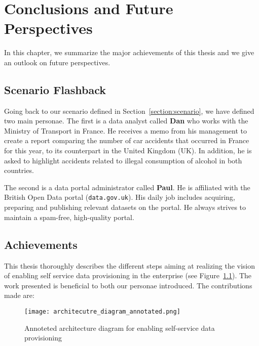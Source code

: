 \chapter{Conclusions and Future Perspectives}  \label{ch:conclusion}
\graphicspath{{conclusions/figures/}}

In this chapter, we summarize the major achievements of this thesis and we give an outlook on future perspectives.

\section{Scenario Flashback}

Going back to our scenario defined in Section~\ref{section:scenario}, we have defined two main personae. The first is a data analyst called \textbf{Dan} who works with the Ministry of Transport in France. He receives a memo from his management to create a report comparing the number of car accidents that occurred in France for this year, to its counterpart in the United Kingdom (UK). In addition, he is asked to highlight accidents related to illegal consumption of alcohol in both countries.

The second is a data portal administrator called \textbf{Paul}. He is affiliated with the British Open Data portal (\texttt{data.gov.uk}). His daily job includes acquiring, preparing and publishing relevant datasets on the portal. He always strives to maintain a spam-free, high-quality portal.

\section{Achievements}

This thesis thoroughly describes the different steps aiming at realizing the vision of enabling self service data provisioning in the enterprise (see Figure~\ref{fig:architecutre_diagram_annotated}). The work presented is beneficial to both our personae introduced. The contributions made are:

\begin{adjustwidth}{-.4in}{-.4in}
	\begin{figure}[!ht]
	  \centering
	  \texttt{[image: architecutre\_diagram\_annotated.png]}
	  \caption{Annoteted architecture diagram for enabling self-service data provisioning}
	  \label{fig:architecutre_diagram_annotated}
	\end{figure}
\end{adjustwidth}

